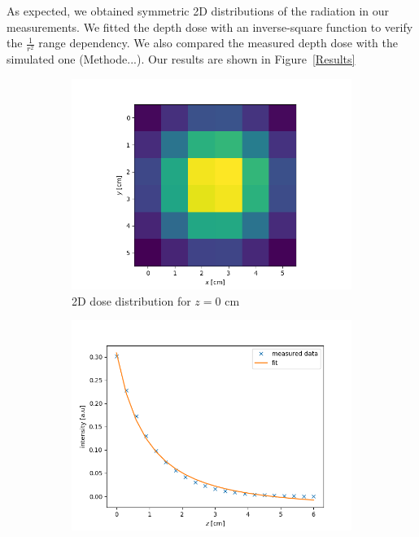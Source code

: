 \documentclass[a4paper,parskip]{scrartcl}
\begin{document}
As expected, we obtained symmetric 2D distributions of the radiation in our measurements.  We fitted the depth dose with an inverse-square function to verify the $\frac{1}{r^2}$ range dependency. We also compared the measured depth dose with the simulated one {\color{red} (Methode...)}. Our results are shown in Figure~\ref{Results}

\begin{figure}
\centering
\begin{subfigure}{0.7\linewidth}
\includegraphics[width = \linewidth]{2D_Dose.png}
\caption{2D dose distribution for $z = 0$ cm}
\end{subfigure}
\begin{subfigure}{0.7\linewidth}
\includegraphics[width = \linewidth]{Fit_invers_quadratisch.png}

\end{subfigure}
\end{figure}
\end{document}
